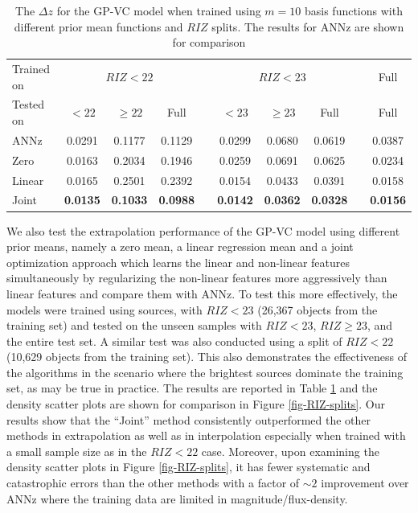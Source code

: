 \documentclass[useAMS,usenatbib,fleqn]{mn2e}
\begin{document}
 \begin{table}
\caption{The $\Delta z$ for the GP-VC model when trained using $m=10$ basis functions with different prior mean functions and $RIZ$ splits. The results for ANNz are shown for comparison}
\begin{center}
  \begin{tabular}{| l | c | c | c | c | c | c | c | c | c |}
  	Trained on				& 	\multicolumn{3}{|c|}{ $RIZ<22$}				&	& 	\multicolumn{3}{c}{$RIZ<23$}  &  & Full\\ \cline{2-4} \cline{6-8} \cline{10-10} 
     	Tested on					&	$<22$			&	$\ge 22$		&	Full				&	&	$<23$	&	$\ge 23$	&	Full	& & Full\\	\hline
	ANNz					&	0.0291			&	0.1177			&	0.1129			&	&	0.0299	&	0.0680	&	0.0619 &  & 0.0387				\\
	Zero						&	0.0163			&	0.2034			&	0.1946			&	&	0.0259	&	0.0691	&	0.0625 &  & 0.0234				\\
	Linear						&	0.0165			&	0.2501			&	0.2392			&	&	0.0154	&	0.0433	&	0.0391 &  & 0.0158				\\
	Joint						&	\textbf{0.0135}	&	\textbf{0.1033}	&	\textbf{0.0988}	&	&	\textbf{0.0142}	&	\textbf{0.0362}	&	\textbf{0.0328} &  & \textbf{0.0156}	\\	\hline
  \end{tabular}
\end{center}
\label{table-RIZ-splits}
\end{table}

We also test the extrapolation performance of the GP-VC model using different prior means, namely a zero mean, a linear regression mean and a joint optimization approach which learns the linear and non-linear features simultaneously by regularizing the non-linear features more aggressively than linear features and compare them with ANNz. To test this more effectively,  the models were trained using sources, with $RIZ<23$ (26,367 objects from the training set) and tested on the unseen samples with $RIZ<23$, $RIZ\ge23$, and the entire test set. A similar test was also conducted using a split of $RIZ<22$ (10,629 objects  from the training set). This also demonstrates the effectiveness of the algorithms in the scenario where the brightest sources dominate the training set, as may be true in practice. The results are reported in Table \ref{table-RIZ-splits} and the density scatter plots are shown for comparison in Figure \ref{fig-RIZ-splits}. Our results show that the ``Joint'' method consistently outperformed the other methods in extrapolation as well as in interpolation especially when trained with a small sample size as in the $RIZ<22$ case. Moreover, upon examining the density scatter plots in Figure \ref{fig-RIZ-splits}, it has fewer systematic and catastrophic errors than the other methods with a factor of $\sim 2$ improvement over ANNz where the training data are limited in magnitude/flux-density.
\end{document}
